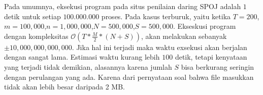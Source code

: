 Pada umumnya, eksekusi program pada situs penilaian daring SPOJ adalah $ 1 $ detik untuk setiap $ 100.000.000 $ proses. Pada kasus terburuk, yaitu ketika $T=200$,$m=100,000$,$n=1,000,000$,$N=500,000$,$S=500,000$. Ekseskusi program dengan kompleksitas $\mathcal{O}(T*\frac{M}{2}*(N+S))$, akan melakukan sebanyak $\pm 10,000,000,000,000$. Jika hal ini terjadi maka waktu exsekusi akan berjalan dengan sangat lama. Estimasi waktu kurang lebih $100$ detik, tetapi kenyataan yang terjadi tidak demikian, alasannya karena jumlah $S$ bisa berkurang seringin dengan perulangan yang ada. Karena dari pernyataan soal bahwa file masukkan tidak akan lebih besar daripada 2 MB\cite{piwakowski_crypto4_2004}.
